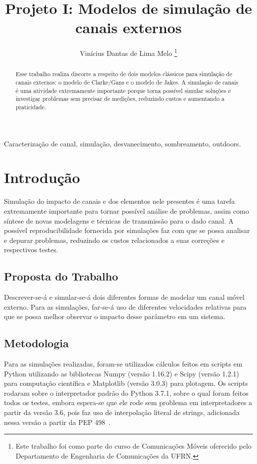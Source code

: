 \documentclass[journal,11pt,twocolumn]{IEEEtran}
\begin{document}
\title{Projeto I: Modelos de simulação de canais externos}


\author{Vinícius Dantas de Lima Melo
    \thanks{Este trabalho foi como parte do curso de Comunicações Móveis oferecido pelo Departamento de Engenharia de Comunicações da UFRN.}
}


\maketitle

\begin{abstract}
Esse trabalho realiza discorre a respeito de dois modelos clássicos para simulação de canais externos: o modelo de Clarke/Gans e o modelo de Jakes. A simulação de canais é uma atividade extremamente importante porque torna possível simular soluções e investigar problemas sem precisar de medições, reduzindo custos e aumentando a praticidade.
\end{abstract}

\begin{keywords}
Caracterização de canal, simulação, desvanecimento, sombreamento, outdoors.
\end{keywords}


\section{Introdução}
Simulação do impacto de canais e dos elementos nele presentes é uma tarefa extremamente importante para tornar possível análise de problemas, assim como síntese de novas modelagens e técnicas de transmissão para o dado canal. A possível reproducibilidade fornecida por simulações faz com que se possa analisar e depurar problemas, reduzindo os custos relacionados a suas correções e respectivos testes. 

\subsection{Proposta do Trabalho}
Descrever-se-á e simular-se-á dois diferentes formas de modelar um canal móvel externo. Para as simulações, far-se-á uso de diferentes velocidades relativas para que se possa melhor observar o impacto desse parâmetro em um sistema.

\subsection{Metodologia}
Para as simulações realizadas, foram-se utilizados cálculos feitos em scripts em Python utilizando as bibliotecas Numpy (versão 1.16.2) e Scipy (versão 1.2.1) para computação científica e Matplotlib (versão 3.0.3) para plotagem. Os scripts rodaram sobre o interpretador padrão do Python 3.7.1, sobre o qual foram feitos todos os testes, embora espera-se que ele rode sem problema em interpretadores a partir da versão 3.6, pois faz uso de interpolação literal de strings, adicionada nessa versão a partir da PEP 498~\cite{fstrings}.
\end{document}
